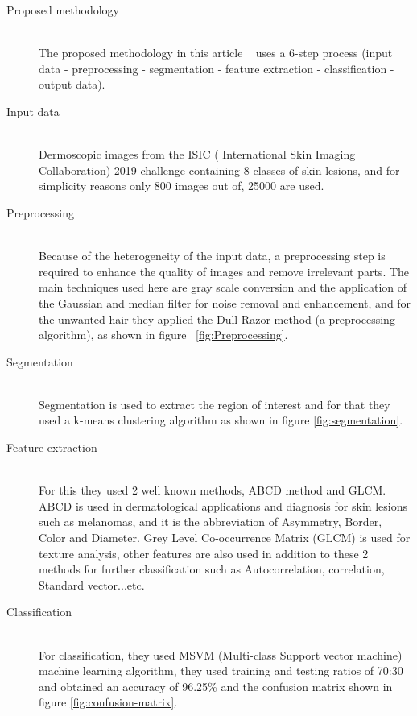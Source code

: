 \begin{description}
    \item [Proposed methodology] \hfill \\
    The proposed methodology in this article ~\cite{Krishna2020} uses a 6-step process (input data - preprocessing - segmentation - feature extraction - classification - output data).
    \item [Input data] \hfill \\ 
        Dermoscopic images from the ISIC ( International Skin Imaging Collaboration) 2019 challenge containing 8 classes of skin lesions, and for simplicity reasons only 800 images out of, 25000 are used.
    
    \item [Preprocessing] \hfill \\
        Because of the heterogeneity of the input data, a preprocessing step is required to enhance the quality of images and remove irrelevant parts. The main techniques used here are gray scale conversion and the application of the Gaussian and median filter for noise removal and enhancement, and for the unwanted hair they applied the Dull Razor method (a preprocessing algorithm), as shown in figure ~\ref{fig:Preprocessing}.

    \item [Segmentation] \hfill \\
        Segmentation is used to extract the region of interest and for that they used a k-means clustering algorithm as shown in figure \ref{fig:segmentation}.
        
    \item [Feature extraction] \hfill \\
        For this they used 2 well known methods, ABCD method and GLCM. ABCD is used in dermatological applications and diagnosis for skin lesions such as melanomas, and it is the abbreviation of Asymmetry, Border, Color and Diameter. Grey Level Co-occurrence Matrix (GLCM) is used for texture analysis, other features are also used in addition to these 2 methods for further classification such as Autocorrelation, correlation, Standard vector...etc.
    
    \item [Classification] \hfill \\
        For classification, they used MSVM (Multi-class Support vector machine) machine learning algorithm, they used training and testing ratios of 70:30 and obtained an accuracy of 96.25\% and the confusion matrix shown in figure \ref{fig:confusion-matrix}.
\end{description}

